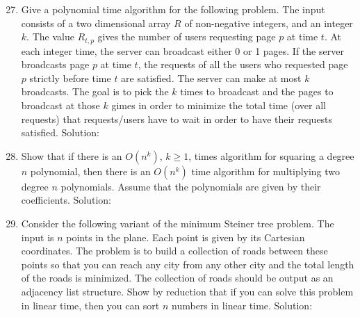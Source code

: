\documentclass{article}
\begin{document}
\begin{enumerate}
\setcounter{enumi}{26}
\item Give a polynomial time algorithm for the following problem. The input consists of a two dimensional array $R$ of non-negative integers, and an integer $k$. The value $R_{t,p}$ gives the number of users requesting page $p$ at time $t$. At each integer time, the server can broadcast either 0 or 1 pages. If the server broadcasts page $p$ at time $t$, the requests of all the users who requested page $p$ strictly before time $t$ are satisfied. The server can make at most $k$ broadcasts. The goal is to pick the $k$ times to broadcast and the pages to broadcast at those $k$ gimes in order to minimize the total time (over all requests) that requests/users have to wait in order to have their requests satisfied.
\newline
\newline Solution:
\newline

\setcounter{enumi}{2}
\item Show that if there is an $O(n^k)$, $k\ge 1$, times algorithm for squaring a degree $n$ polynomial, then there is an $O(n^k)$ time algorithm for multiplying two degree $n$ polynomials. Assume that the polynomials are given by their coefficients.
\newline
\newline Solution: 
\newline

\item Consider the following variant of the minimum Steiner tree problem. The input is $n$ points in the plane. Each point is given by its Cartesian coordinates. The problem is to build a collection of roads between these points so that you can reach any city from any other city and the total length of the roads is minimized. The collection of roads should be output as an adjacency list structure. Show by reduction that if you can solve this problem in linear time, then you can sort $n$ numbers in linear time.
\newline
\newline Solution:
\newline

\end{enumerate}
\end{document}
